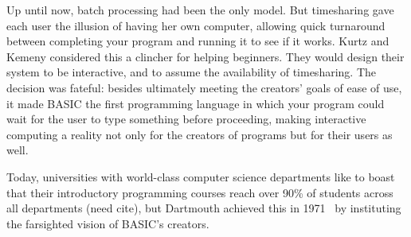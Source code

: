 Up until now, batch processing had been the only model.
But timesharing gave each user the illusion of having her own computer,
allowing quick turnaround between completing your program and running
it to see if it works.
Kurtz and Kemeny considered this a clincher for helping beginners.
They would design their system to be
interactive, and to assume the availability of timesharing.  The
decision was fateful: besides ultimately meeting the creators' goals
of ease of use, it made BASIC the first programming language in which
your program could wait for the user to type something before
proceeding, making interactive computing a reality not only for the
creators of programs but for their users as well.

Today, universities with world-class computer science
departments like to boast that their introductory programming courses
reach over 90\% of
students across all departments (need cite), but
Dartmouth achieved this in 1971~\cite{man_and_computer} by instituting the farsighted 
vision of BASIC's creators.
